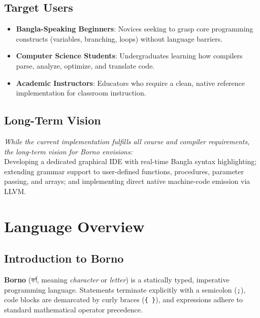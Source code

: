 \documentclass[12pt, a4paper]{report}
\begin{document}
\section{Target Users}
\begin{itemize}
    \item \textbf{Bangla-Speaking Beginners}: Novices seeking to grasp core programming constructs (variables, branching, loops) without language barriers.
    \item \textbf{Computer Science Students}: Undergraduates learning how compilers parse, analyze, optimize, and translate code.
    \item \textbf{Academic Instructors}: Educators who require a clean, native reference implementation for classroom instruction.
\end{itemize}

\section{Long-Term Vision}
\textit{While the current implementation fulfills all course and compiler requirements, the long-term vision for Borno envisions:}\\
Developing a dedicated graphical IDE with real-time Bangla syntax highlighting; extending grammar support to user-defined functions, procedures, parameter passing, and arrays; and implementing direct native machine-code emission via LLVM.

\chapter{Language Overview}

\section{Introduction to Borno}
\textbf{Borno} (বর্ণ, meaning \textit{character} or \textit{letter}) is a statically typed, imperative programming language. Statements terminate explicitly with a semicolon (\texttt{;}), code blocks are demarcated by curly braces (\texttt{\{ \}}), and expressions adhere to standard mathematical operator precedence.
\end{document}
